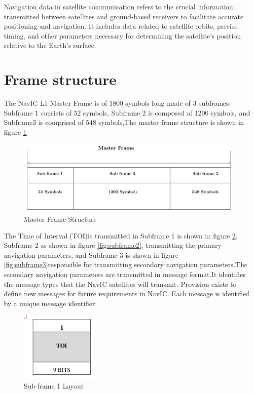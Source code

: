 
Navigation data in satellite communication refers to the crucial information transmitted between satellites and ground-based receivers to facilitate accurate positioning and navigation. It includes data related to satellite orbits, precise timing, and other parameters necessary for determining the satellite's position relative to the Earth's surface.
\section{Frame structure}
The NavIC L1 Master Frame is of $1800$ symbols long made of $3$ subframes. Subframe $1$ consists of $52$ symbols, Subframe $2$ is composed of 1$200$ symbols, and Subframe$3$ is comprised of $548$ symbols,The master frame structure is shown in figure \ref{fig:master_frame}


\begin{figure}[ht]
\centering
\includegraphics[width=0.8\columnwidth]{figs/master_frame}
\centering
\captionsetup{justification=centering}
\caption{Master Frame Structure}
\label{fig:master_frame}
\end{figure}


The Time of Interval (TOI)is transmitted in Subframe 1 is shown in figure \ref{fig:subframe1}. Subframe $2$ as shown in figure \ref{fig:subframe2}, transmitting the primary navigation parameters, and Subframe $3$ is shown in figure \ref{fig:subframe3}responsible for transmitting secondary navigation parameters.The secondary navigation parameters are transmitted in message format.It identifies the message types that the NavIC satellites will transmit. Provision exists to define new messages for future requirements in NavIC. Each message is identified by a unique message identifier.
 


\begin{figure}[ht]
\centering
\includegraphics[width=0.4\columnwidth]{figs/subframe1.png}
\centering
\captionsetup{justification=centering}
\caption{ Sub-frame 1 Layout}
\label{fig:subframe1}
\end{figure}

